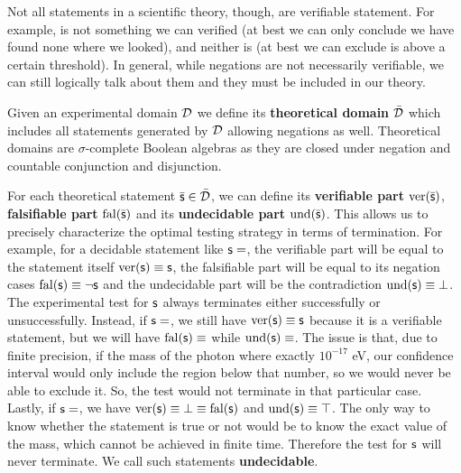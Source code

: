 \documentclass[twocolumn]{article}
\begin{document}
Not all statements in a scientific theory, though, are verifiable statement. For example,  is not something we can verified (at best we can only conclude we have found none where we looked), and neither is  (at best we can exclude is above a certain threshold). In general, while negations are not necessarily verifiable, we can still logically talk about them and they must be included in our theory.

Given an experimental domain $\mathcal{D}$ we define its \textbf{theoretical domain} $\bar{\mathcal{D}}$ which includes all statements generated by $\mathcal{D}$ allowing negations as well. Theoretical domains are $\sigma$-complete Boolean algebras as they are closed under negation and countable conjunction and disjunction.

For each theoretical statement $\bar{\mathsf{s}} \in \bar{\mathcal{D}}$, we can define its \textbf{verifiable part} $\operatorname{ver}(\bar{\mathsf{s}})$, \textbf{falsifiable part} $\operatorname{fal}(\bar{\mathsf{s}})$ and its \textbf{undecidable part} $\operatorname{und}(\bar{\mathsf{s}})$. This allows us to precisely characterize the optimal testing strategy in terms of termination. For example, for a decidable statement like $\mathsf{s}=$, the verifiable part will be equal to the statement itself $\operatorname{ver}(\mathsf{s}) \equiv \mathsf{s}$, the falsifiable part will be equal to its negation cases $\operatorname{fal}(\mathsf{s}) \equiv \neg\mathsf{s}$ and the undecidable part will be the contradiction $\operatorname{und}(\mathsf{s}) \equiv \bot$. The experimental test for $\mathsf{s}$ always terminates either successfully or unsuccessfully. Instead, if $\mathsf{s}=$, we still have $\operatorname{ver}(\mathsf{s}) \equiv \mathsf{s}$ because it is a verifiable statement, but we will have $\operatorname{fal}(\mathsf{s}) \equiv$ while $\operatorname{und}(\mathsf{s}) \equiv$. The issue is that, due to finite precision, if the mass of the photon where exactly $10^{-17}$ eV, our confidence interval would only include the region below that number, so we would never be able to exclude it. So, the test would not terminate in that particular case. Lastly, if $\mathsf{s}=$, we have $\operatorname{ver}(\mathsf{s}) \equiv \bot \equiv \operatorname{fal}(\mathsf{s})$ and $\operatorname{und}(\mathsf{s}) \equiv \top$. The only way to know whether the statement is true or not would be to know the exact value of the mass, which cannot be achieved in finite time. Therefore the test for $\mathsf{s}$ will never terminate. We call such statements \textbf{undecidable}.
\end{document}
